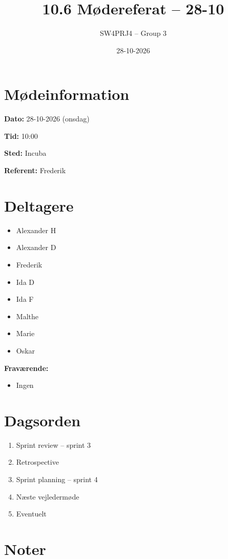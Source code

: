 \documentclass[a4paper,11pt]{article}
\title{10.6 Mødereferat -- 28-10}
\author{SW4PRJ4 -- Group 3}
\date{28-10-2026}
\begin{document}
\maketitle

\section*{Mødeinformation}

\textbf{Dato:} 28-10-2026 (onsdag)

\textbf{Tid:} 10:00

\textbf{Sted:} Incuba

\textbf{Referent:} Frederik

\section*{Deltagere}

\begin{itemize}
    \item Alexander H
    \item Alexander D
    \item Frederik
    \item Ida D
    \item Ida F
    \item Malthe
    \item Marie
    \item Oskar
\end{itemize}

\textbf{Fraværende:}

\begin{itemize}
    \item Ingen
\end{itemize}

\section*{Dagsorden}

\begin{enumerate}
    \item Sprint review -- sprint 3
    \item Retrospective
    \item Sprint planning -- sprint 4
    \item Næste vejledermøde
    \item Eventuelt
\end{enumerate}

\section*{Noter}
\end{document}
